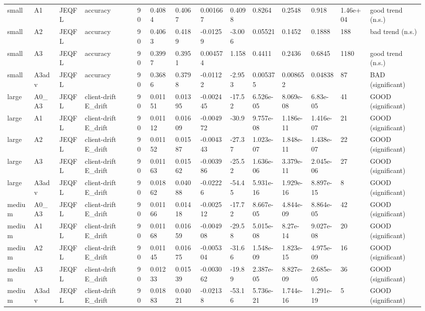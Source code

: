 \begin{table}[t]
\begin{tabular}{llllllllllllll}
small & A1 & JEQFL & accuracy & 90 & 0.4084 & 0.4067 & 0.001667 & 0.4098 & 0.8264 & 0.2548 & 0.918 & 1.46e+04 & good trend (n.s.) \\
small & A2 & JEQFL & accuracy & 90 & 0.4063 & 0.4189 & -0.01259 & -3.006 & 0.05521 & 0.1452 & 0.1888 & 188 & bad trend (n.s.) \\
small & A3 & JEQFL & accuracy & 90 & 0.3997 & 0.3951 & 0.004574 & 1.158 & 0.4411 & 0.2436 & 0.6845 & 1180 & good trend (n.s.) \\
small & A3adv & JEQFL & accuracy & 90 & 0.3686 & 0.3798 & -0.01122 & -2.953 & 0.005375 & 0.008652 & 0.04838 & 87 & BAD (significant) \\
large & A0\_A3 & JEQFL & client-drift E\_drift & 90 & 0.01151 & 0.01395 & -0.002445 & -17.52 & 6.526e-05 & 8.069e-08 & 6.83e-05 & 41 & GOOD (significant) \\
large & A1 & JEQFL & client-drift E\_drift & 90 & 0.01112 & 0.01609 & -0.004972 & -30.9 & 9.757e-08 & 1.186e-11 & 1.416e-07 & 21 & GOOD (significant) \\
large & A2 & JEQFL & client-drift E\_drift & 90 & 0.01152 & 0.01587 & -0.004343 & -27.37 & 1.023e-07 & 1.848e-11 & 1.438e-07 & 22 & GOOD (significant) \\
large & A3 & JEQFL & client-drift E\_drift & 90 & 0.01163 & 0.01562 & -0.003986 & -25.52 & 1.636e-06 & 3.379e-11 & 2.045e-06 & 27 & GOOD (significant) \\
large & A3adv & JEQFL & client-drift E\_drift & 90 & 0.01862 & 0.04088 & -0.02226 & -54.45 & 5.931e-16 & 1.929e-16 & 8.897e-15 & 8 & GOOD (significant) \\
medium & A0\_A3 & JEQFL & client-drift E\_drift & 90 & 0.01166 & 0.01418 & -0.002512 & -17.72 & 8.667e-05 & 4.844e-09 & 8.864e-05 & 42 & GOOD (significant) \\
medium & A1 & JEQFL & client-drift E\_drift & 90 & 0.01168 & 0.01659 & -0.004908 & -29.58 & 5.015e-08 & 8.27e-14 & 9.027e-08 & 20 & GOOD (significant) \\
medium & A2 & JEQFL & client-drift E\_drift & 90 & 0.01145 & 0.01675 & -0.005304 & -31.66 & 1.548e-09 & 1.823e-15 & 4.975e-09 & 16 & GOOD (significant) \\
medium & A3 & JEQFL & client-drift E\_drift & 90 & 0.01233 & 0.01539 & -0.003062 & -19.89 & 2.387e-05 & 8.827e-09 & 2.685e-05 & 36 & GOOD (significant) \\
medium & A3adv & JEQFL & client-drift E\_drift & 90 & 0.01883 & 0.04021 & -0.02138 & -53.16 & 5.736e-21 & 1.744e-16 & 1.291e-19 & 5 & GOOD (significant) \\

\end{tabular}
\end{table}
